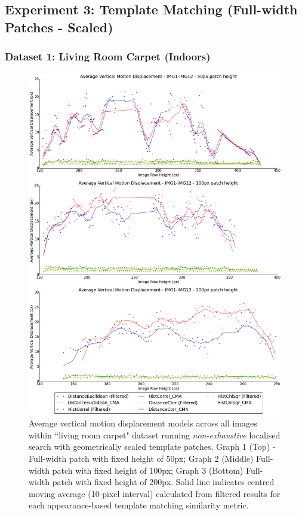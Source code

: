 \clearpage
\subsection{Experiment 3: Template Matching (Full-width Patches - Scaled)}

\subsubsection{Dataset 1: Living Room Carpet (Indoors)}

\begin{figure}[ht!]
\centering
\includegraphics[scale=0.3]{images/results/flat_10cm_scaled}
\caption{Average vertical motion displacement models across all images within ``living room carpet" dataset running \textit{non-exhaustive} localised search with geometrically scaled template patches. Graph 1 (Top) - Full-width patch with fixed height of 50px; Graph 2 (Middle) Full-width patch with fixed height of 100px; Graph 3 (Bottom) Full-width patch with fixed height of 200px. Solid line indicates centred moving average (10-pixel interval) calculated from filtered results for each appearance-based template matching similarity metric.}
\label{fig:ex3_1_1}
\end{figure}

